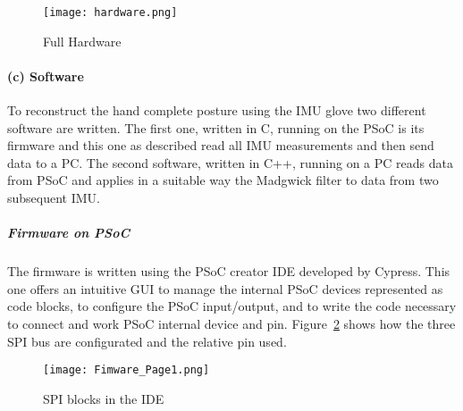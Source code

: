 \begin{figure}[h]
\centering
\texttt{[image: hardware.png]}
\caption{Full Hardware}
\label{fig:hardware}
\end{figure}


\paragraph{(c) Software}

To reconstruct the hand complete posture using the IMU glove two different software are written. The first one, written in C, running on the PSoC is its firmware and this one as described read all IMU measurements and then send data to a PC.
The second software, written in C++, running on a PC reads data from PSoC and applies in a suitable way the Madgwick filter to data from two subsequent IMU.

\subparagraph{Firmware on PSoC}

The firmware is written using the PSoC creator IDE developed by Cypress. This one offers an intuitive GUI to
manage the internal PSoC devices represented as code blocks, to configure the PSoC input/output, and to write the code necessary to connect and work PSoC internal device and pin. %
Figure~\ref{fig:firmwarepage1} shows how the three SPI bus are configurated and the relative pin used.%

\begin{figure}[h]
\centering
\texttt{[image: Fimware\_Page1.png]}
\caption{SPI blocks in the IDE}
\label{fig:firmwarepage1}
\end{figure}

